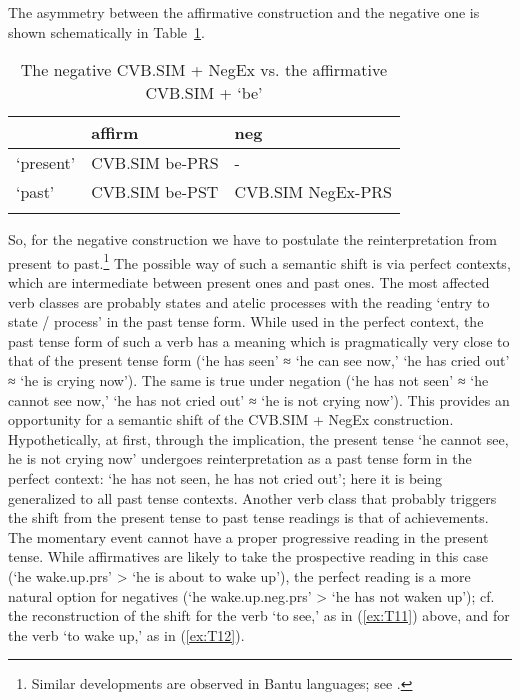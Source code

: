 \documentclass[output=paper]{langscibook}
\begin{document}
The asymmetry between the affirmative construction and the negative one is shown schematically in Table \ref{tab:T10}.

\begin{table}
    \caption{The negative CVB.SIM + NegEx vs. the affirmative CVB.SIM + ‘be’}
    \label{tab:T10}
    \begin{tabular}{lll}
    \lsptoprule
     & affirm & neg \\ \midrule
    ‘present’ & CVB.SIM be-PRS & -\footnotemark \\
    ‘past’ & CVB.SIM be-PST & CVB.SIM NegEx-PRS \\ \lspbottomrule
    \end{tabular}
    \end{table}


So, for the negative construction we have to postulate the reinterpretation from present to past.\footnote{Similar developments are observed in Bantu languages; see \citet[148]{Nurse2008}.} The possible way of such a semantic shift is via perfect contexts, which are intermediate between present ones and past ones. The most affected verb classes are probably states and atelic processes with the reading ‘entry to state / process’ in the past tense form. While used in the perfect context, the past tense form of such a verb has a meaning which is pragmatically very close to that of the present tense form (‘he has seen’ ≈ ‘he can see now,’ ‘he has cried out’ ≈ ‘he is crying now’). The same is true under negation (‘he has not seen’ ≈ ‘he cannot see now,’ ‘he has not cried out’ ≈ ‘he is not crying now’). This provides an opportunity for a semantic shift of the CVB.SIM + NegEx construction. Hypothetically, at first, through the implication, the present tense ‘he cannot see, he is not crying now’ undergoes reinterpretation as a past tense form in the perfect context: ‘he has not seen, he has not cried out’; here it is being generalized to all past tense contexts. Another verb class that probably triggers the shift from the present tense to past tense readings is that of achievements. The momentary event cannot have a proper progressive reading in the present tense. While affirmatives are likely to take the prospective reading in this case (‘he wake.up.prs’ > ‘he is about to wake up’), the perfect reading is a more natural option for negatives (‘he wake.up.neg.prs’ > ‘he has not waken up’); cf. the reconstruction of the shift for the verb ‘to see,’ as in (\ref{ex:T11}) above, and for the verb ‘to wake up,’ as in (\ref{ex:T12}).
\end{document}
